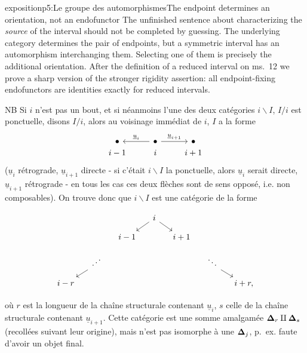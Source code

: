 \begin{dcomment}{exposition}{p5:Le groupe des automorphismes}{The endpoint determines an orientation, not an endofunctor}
The unfinished sentence about characterizing the \emph{source} of the interval should not be completed by guessing. The underlying category determines the pair of endpoints, but a symmetric interval has an automorphism interchanging them. Selecting one of them is precisely the additional orientation. After the definition of a reduced interval on ms.~12 we prove a sharp version of the stronger rigidity assertion: all endpoint-fixing endofunctors are identities exactly for reduced intervals.
\end{dcomment}


NB Si $i$ n'est pas un bout, et si néanmoins l'une des deux catégories $i\backslash I$, $I/i$ est ponctuelle, disons $I/i$, alors au voisinage immédiat de $i$, $I$ a la forme
\[
\begin{tikzcd}[row sep=0pt]
\bullet & \bullet \arrow[l, "\underline{u}_i"'] \arrow[r, "\underline{u}_{i+1}"] & \bullet \\
i-1 & i & i+1
\end{tikzcd}
\]
($\underline{u}_i$ rétrograde, $\underline{u}_{i+1}$ directe - si c'était $i\backslash I$ la ponctuelle, alors $\underline{u}_i$ serait directe, $\underline{u}_{i+1}$ rétrograde - en tous les cas ces deux flèches sont de sens opposé, i.e. non composables). On trouve donc que $i\backslash I$ est une catégorie de la forme


\[
\begin{tikzcd}[column sep=small, row sep=small]
 & & & i \arrow[dl] \arrow[dr] & & & \\
 & & i-1 & & i+1 & & \\
 & \iddots \arrow[dl] & & & & \ddots \arrow[dr] & \\
 i-r & & & & & & i+r, %
\end{tikzcd}
\]

où $r$ est la longueur de la chaîne structurale contenant $\underline{u}_i$, $s$ celle de la chaîne structurale contenant $\underline{u}_{i+1}$. Cette catégorie est une somme amalgamée $\boldsymbol{\Delta}_r \amalg \boldsymbol{\Delta}_s$ (recollées suivant leur origine), mais n'est pas isomorphe à une $\boldsymbol{\Delta}_j$, p.~ex. faute d'avoir un objet final.

